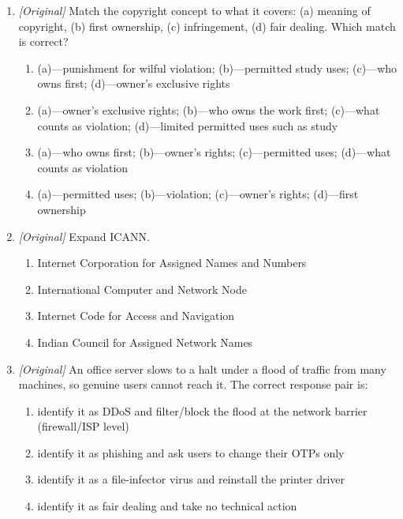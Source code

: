 \begin{enumerate}[label=\textbf{Q\arabic*.}, leftmargin=*]
  \begin{enumerate}[label=\Alph*.]
    \item copyright infringement
    \item fair dealing for private study
    \item first ownership
    \item lawful backup under licence
  \end{enumerate}
\item \textit{[Original]} Match the copyright concept to what it covers: (a) meaning of copyright, (b) first ownership, (c) infringement, (d) fair dealing. Which match is correct?
  \begin{enumerate}[label=\Alph*.]
    \item (a)---punishment for wilful violation; (b)---permitted study uses; (c)---who owns first; (d)---owner's exclusive rights
    \item (a)---owner's exclusive rights; (b)---who owns the work first; (c)---what counts as violation; (d)---limited permitted uses such as study
    \item (a)---who owns first; (b)---owner's rights; (c)---permitted uses; (d)---what counts as violation
    \item (a)---permitted uses; (b)---violation; (c)---owner's rights; (d)---first ownership
  \end{enumerate}
\item \textit{[Original]} Expand ICANN.
  \begin{enumerate}[label=\Alph*.]
    \item Internet Corporation for Assigned Names and Numbers
    \item International Computer and Network Node
    \item Internet Code for Access and Navigation
    \item Indian Council for Assigned Network Names
  \end{enumerate}
\item \textit{[Original]} An office server slows to a halt under a flood of traffic from many machines, so genuine users cannot reach it. The correct response pair is:
  \begin{enumerate}[label=\Alph*.]
    \item identify it as DDoS and filter/block the flood at the network barrier (firewall/ISP level)
    \item identify it as phishing and ask users to change their OTPs only
    \item identify it as a file-infector virus and reinstall the printer driver
    \item identify it as fair dealing and take no technical action
  \end{enumerate}


\end{enumerate}
